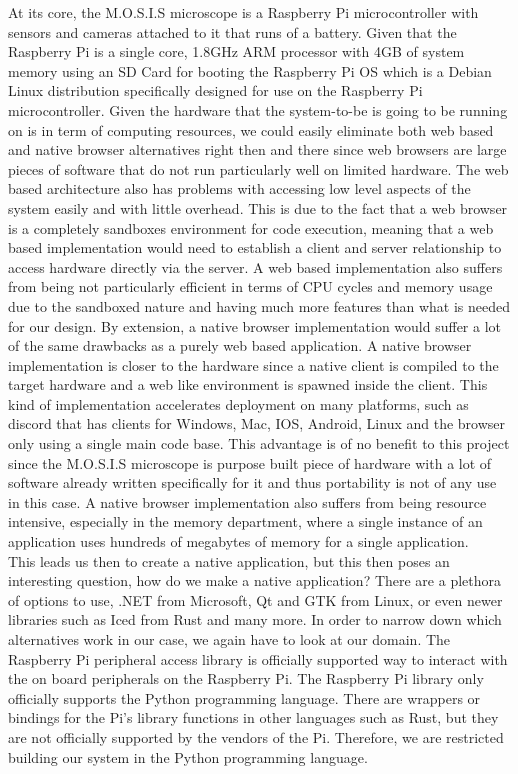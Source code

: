At its core, the M.O.S.I.S microscope is a Raspberry Pi microcontroller with sensors and cameras attached to it that runs of a battery. Given that the Raspberry Pi is a single core, 1.8GHz ARM processor with 4GB of system memory using an SD Card for booting the Raspberry Pi OS which is a Debian Linux distribution specifically designed for use on the Raspberry Pi microcontroller.\cite{ltdRaspberryPiModel}\cite{DebianUniversalOperating} Given the hardware that the system-to-be is going to be running on is in term of computing resources, we could easily eliminate both web based and native browser alternatives right then and there since web browsers are large pieces of software that do not run particularly well on limited hardware. The web based architecture also has problems with accessing low level aspects of the system easily and with little overhead. This is due to the fact that a web browser is a completely sandboxes environment for code execution, meaning that a web based implementation would need to establish a client and server relationship to access hardware directly via the server. A web based implementation also suffers from being not particularly efficient in terms of CPU cycles and memory usage due to the sandboxed nature and having much more features than what is needed for our design. By extension, a native browser implementation would suffer a lot of the same drawbacks as a purely web based application. A native browser implementation is closer to the hardware since a native client is compiled to the target hardware and a web like environment is spawned inside the client. This kind of implementation accelerates deployment on many platforms, such as discord that has clients for Windows, Mac, IOS, Android, Linux and the browser only using a single main code base.\cite{Discord2023}  This advantage is of no benefit to this project since the M.O.S.I.S microscope is purpose built piece of hardware with a lot of software already written specifically for it and thus portability is not of any use in this case. A native browser implementation also suffers from being resource intensive, especially in the memory department, where a single instance of an application uses hundreds of megabytes of memory for a single application.\\
This leads us then to create a native application, but this then poses an interesting question, how do we make a native application? There are a plethora of options to use, .NET from Microsoft, Qt and GTK from Linux, or even newer libraries such as Iced from Rust and many more. In order to narrow down which alternatives work in our case, we again have to look at our domain. The Raspberry Pi peripheral access library is officially supported way to interact with the on board peripherals on the Raspberry Pi. The Raspberry Pi library only officially supports the Python programming language. There are wrappers or bindings for the Pi's library functions in other languages such as Rust, but they are not officially supported by the vendors of the Pi. Therefore, we are restricted building our system in the Python programming language.\\
